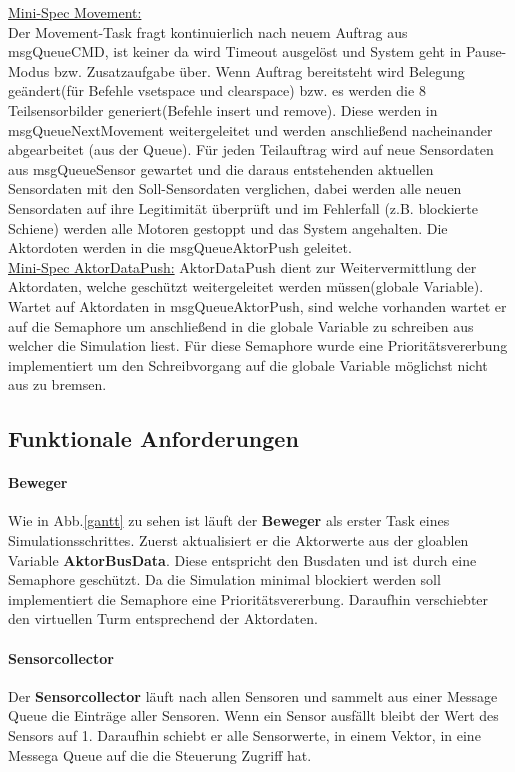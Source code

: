 \underline{Mini-Spec Movement:}\\
Der Movement-Task fragt kontinuierlich nach neuem Auftrag aus msgQueueCMD, ist keiner da wird Timeout ausgelöst und System geht in Pause-Modus bzw. Zusatzaufgabe über. Wenn Auftrag bereitsteht wird Belegung geändert(für Befehle vsetspace und clearspace) bzw. es werden die 8 Teilsensorbilder generiert(Befehle insert und remove). Diese werden in msgQueueNextMovement weitergeleitet und werden anschließend nacheinander abgearbeitet (aus der Queue). Für jeden Teilauftrag wird auf neue Sensordaten aus msgQueueSensor gewartet und die daraus entstehenden aktuellen Sensordaten mit den Soll-Sensordaten verglichen, dabei werden alle neuen Sensordaten auf ihre Legitimität überprüft und im Fehlerfall (z.B. blockierte Schiene) werden alle Motoren gestoppt und das System angehalten. Die Aktordoten werden in die msgQueueAktorPush geleitet. \\

\underline{Mini-Spec AktorDataPush:}
AktorDataPush dient zur Weitervermittlung der Aktordaten, welche geschützt weitergeleitet werden müssen(globale Variable).
Wartet auf Aktordaten in msgQueueAktorPush, sind welche vorhanden wartet er auf die Semaphore um anschließend in die globale Variable zu schreiben aus welcher die Simulation liest. Für diese Semaphore wurde eine Prioritätsvererbung implementiert um den Schreibvorgang auf die globale Variable möglichst nicht aus zu bremsen. \\


\subsection {Funktionale Anforderungen}

\paragraph{Beweger}
Wie in Abb.\ref{gantt} zu sehen ist läuft der \textbf{Beweger} als erster Task eines Simulationsschrittes. Zuerst aktualisiert er die Aktorwerte aus der gloablen Variable \textbf{AktorBusData}. Diese entspricht den Busdaten und ist durch eine Semaphore geschützt. Da die Simulation minimal blockiert werden soll implementiert die Semaphore eine Prioritätsvererbung. Daraufhin \glqq verschiebt\grqq   er den virtuellen Turm entsprechend der Aktordaten.

\paragraph{Sensorcollector}
Der \textbf{Sensorcollector} läuft nach allen Sensoren und sammelt  aus einer Message Queue die Einträge aller Sensoren. Wenn ein Sensor ausfällt bleibt der Wert des Sensors auf 1. Daraufhin schiebt er alle Sensorwerte, in einem Vektor, in eine Messega Queue auf die die Steuerung Zugriff hat.

